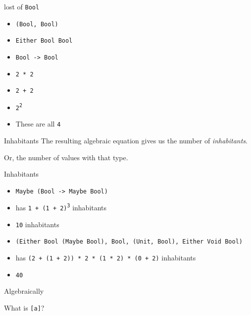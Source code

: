 \begin{frame}
\begin{block}{lost of \lstinline{Bool}}
\begin{itemize}
  \item<1-> \lstinline{(Bool, Bool)}
  \item<1-> \lstinline{Either Bool Bool}
  \item<1-> \lstinline{Bool -> Bool}
  \item<2-> \lstinline{2 * 2}
  \item<2-> \lstinline{2 + 2}
  \item<2-> \lstinline{2}\textsuperscript{\lstinline{2}}
  \item<3-> These are all \lstinline{4}
\end{itemize}
\end{block}
\end{frame}

\begin{frame}
\begin{block}{Inhabitants}
The resulting algebraic equation gives us the number of \emph{inhabitants}.

Or, the number of values with that type.
\end{block}
\end{frame}

\begin{frame}
\begin{block}{Inhabitants}
\begin{itemize}
  \item<1-> \lstinline{Maybe (Bool -> Maybe Bool)}
  \item<1-> has \lstinline{1 + (1 + 2)}\textsuperscript{\lstinline{3}} inhabitants
  \item<1-> \lstinline{10} inhabitants
  \item<2-> \scriptsize{\lstinline{(Either Bool (Maybe Bool), Bool, (Unit, Bool), Either Void Bool)}}
  \item<2-> has \lstinline{(2 + (1 + 2)) * 2 * (1 * 2) * (0 + 2)} inhabitants
  \item<2-> \lstinline{40}
\end{itemize}
\end{block}
\end{frame}

\begin{frame}
\begin{block}{Algebraically}
\begin{center}
What is \lstinline{[a]}?
\end{center}
\end{block}
\end{frame}

